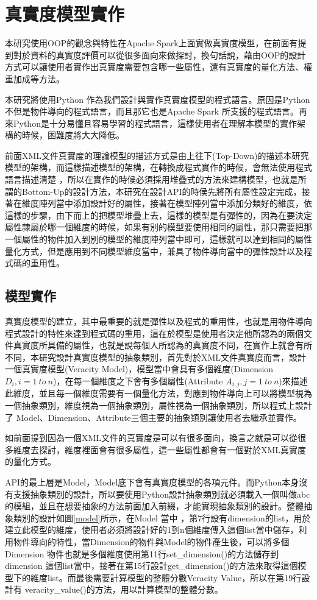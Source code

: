 \section{真實度模型實作}
本研究使用OOP的觀念與特性在Apache Spark上面實做真實度模型，在前面有提到對於資料的真實度評價可以從很多面向來做探討，換句話說，藉由OOP的設計方式可以讓使用者實作出真實度需要包含哪一些屬性，還有真實度的量化方法、權重加成等方法。\\\par
本研究將使用Python 作為我們設計與實作真實度模型的程式語言。原因是Python 不但是物件導向的程式語言，而且那它也是Apache Spark 所支援的程式語言。再來Python是十分易懂且容易學習的程式語言，這樣使用者在理解本模型的實作架構的時候，困難度將大大降低。\\\par
前面XML文件真實度的理論模型的描述方式是由上往下(Top-Down)的描述本研究模型的架構，而這樣描述模型的架構，在轉換成程式實作的時候，會無法使用程式語言描述清楚 ，所以在實作的時候必須採用堆疊式的方法來建構模型，也就是所謂的Bottom-Up的設計方法，本研究在設計API的時侯先將所有屬性設定完成，接著在維度陣列當中添加設計好的屬性，接著在模型陣列當中添加分類好的維度，依這樣的步驟，由下而上的把模型堆疊上去，這樣的模型是有彈性的，因為在要決定屬性隸屬於哪一個維度的時候，如果有別的模型要使用相同的屬性，那只需要把那一個屬性的物件加入到別的模型的維度陣列當中即可，這樣就可以達到相同的屬性量化方式，但是應用到不同模型維度當中，兼具了物件導向當中的彈性設計以及程式碼的重用性。
\subsection{模型實作}
真實度模型的建立，其中最重要的就是彈性以及程式的重用性，也就是用物件導向程式設計的特性來達到程式碼的重用，這在於模型是使用者決定他所認為的兩個文件真實度所具備的屬性，也就是說每個人所認為的真實度不同，在實作上就會有所不同，本研究設計真實度模型的抽象類別，首先對於XML文件真實度而言，設計一個真實度模型(Veracity Model)，模型當中會具有多個維度(Dimension $D_i,  i=1\ to\ n$)，在每一個維度之下會有多個屬性(Attribute $A_{i, j}, j=1\ to\ n$)來描述此維度，並且每一個維度需要有一個量化方法，對應到物件導向上可以將模型視為一個抽象類別，維度視為一個抽象類別，屬性視為一個抽象類別，所以程式上設計了 Model、Dimension、Attribute三個主要的抽象類別讓使用者去繼承並實作。\\\par
如前面提到因為一個XML文件的真實度是可以有很多面向，換言之就是可以從很多維度去探討，維度裡面會有很多屬性，這一些屬性都會有一個對於XML真實度的量化方式。\\\par
API的最上層是Model，Model底下會有真實度模型的各項元件。而Python本身沒有支援抽象類別的設計，所以要使用Python設計抽象類別就必須載入一個叫做abc的模組，並且在想要抽象的方法前面加入前綴，才能實現抽象類別的設計。整體抽象類別的設計如圖\ref{model}所示，在Model 當中 ，第7行設有dimension的list，用於建立此模型的維度，使用者必須將設計好的1到n個維度傳入這個list當中儲存，利用物件導向的特性，當Dimension的物件與Model的物件產生後，可以將多個Dimension 物件也就是多個維度使用第11行set\_dimension()的方法儲存到 dimension 這個list當中，接著在第15行設計get\_dimension()的方法來取得這個模型下的維度list。而最後需要計算模型的整體分數Veracity Value，所以在第19行設計有 veracity\_value()的方法，用以計算模型的整體分數。

